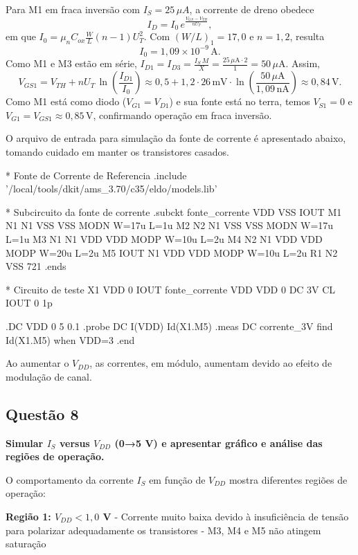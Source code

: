 ﻿\documentclass[12pt,a4paper]{article}
\begin{document}
Para M1 em fraca inversão com $I_S = 25\,\mu A$, a corrente de dreno obedece
$$I_D = I_0\, e^{\frac{V_{GS} - V_{TH}}{nU_T}},$$
em que $I_0 = \mu_n C_{ox} \tfrac{W}{L} (n-1)U_T^2$. Com $(W/L)_1=17{,}0$ e $n=1{,}2$, resulta
$$I_0 = 1{,}09 \times 10^{-9}\,\text{A}.$$
Como M1 e M3 estão em série, $I_{D1}=I_{D3}=\tfrac{I_S\,M}{X}=\tfrac{25\,\mu\text{A}\cdot 2}{1}=50\,\mu\text{A}$. Assim,
$$V_{GS1} = V_{TH} + nU_T\,\ln\!\left(\frac{I_{D1}}{I_0}\right) \approx 0{,}5 + 1{,}2\cdot 26\,\text{mV}\cdot \ln\!\left(\frac{50\,\mu\text{A}}{1{,}09\,\text{nA}}\right) \approx 0{,}84\,\text{V}.$$
Como M1 está como diodo ($V_{G1}=V_{D1}$) e sua fonte está no terra, temos $V_{S1}=0$ e $V_{G1}=V_{GS1}\approx 0{,}85\,\text{V}$, confirmando operação em fraca inversão.

O arquivo de entrada para simulação da fonte de corrente é apresentado abaixo, tomando cuidado em manter os transistores casados.

\begin{codeblock}[title={Arquivo de simulação da fonte de corrente}]
* Fonte de Corrente de Referencia
.include '/local/tools/dkit/ams_3.70/c35/eldo/models.lib'

* Subcircuito da fonte de corrente
.subckt fonte_corrente VDD VSS IOUT
M1 N1 N1 VSS VSS MODN W=17u L=1u
M2 N2 N1 VSS VSS MODN W=17u L=1u
M3 N1 N1 VDD VDD MODP W=10u L=2u
M4 N2 N1 VDD VDD MODP W=20u L=2u
M5 IOUT N1 VDD VDD MODP W=10u L=2u
R1 N2 VSS 721
.ends

* Circuito de teste
X1 VDD 0 IOUT fonte_corrente
VDD VDD 0 DC 3V
CL IOUT 0 1p

.DC VDD 0 5 0.1
.probe DC I(VDD) Id(X1.M5)
.meas DC corrente_3V find Id(X1.M5) when VDD=3
.end
\end{codeblock}

Ao aumentar o $V_{DD}$, as correntes, em módulo, aumentam devido ao efeito de modulação de canal.

\subsection*{Questão 8}
	\textbf{Simular $I_S$ versus $V_{DD}$ (0→5 V) e apresentar gráfico e análise das regiões de operação.}



O comportamento da corrente $I_S$ em função de $V_{DD}$ mostra diferentes regiões de operação:

\textbf{Região 1: $V_{DD} < 1,0$ V}
- Corrente muito baixa devido à insuficiência de tensão para polarizar adequadamente os transistores
- M3, M4 e M5 não atingem saturação
\end{document}

